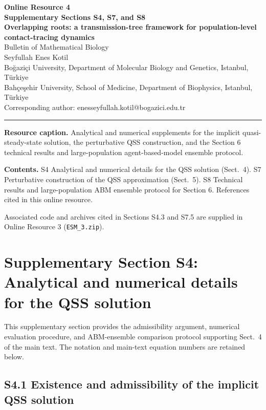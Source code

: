 \documentclass[9pt,a4paper]{article}
\begin{document}
\begin{center}
{\large\bfseries Online Resource 4}\\[0.3em]
{\bfseries Supplementary Sections S4, S7, and S8}\\[1.0em]
{\bfseries Overlapping roots: a transmission-tree framework for population-level contact-tracing dynamics}\\[0.8em]
Bulletin of Mathematical Biology\\[0.6em]
Seyfullah Enes Kotil\\
Boğaziçi University, Department of Molecular Biology and Genetics, Istanbul, Türkiye\\
Bahçeşehir University, School of Medicine, Department of Biophysics, Istanbul, Türkiye\\[0.4em]
Corresponding author: enesseyfullah.kotil@bogazici.edu.tr
\end{center}
\vspace{0.3em}\hrule\vspace{0.8em}

\textbf{Resource caption.} Analytical and numerical supplements for the implicit quasi-steady-state solution, the perturbative QSS construction, and the Section 6 technical results and large-population agent-based-model ensemble protocol.

\textbf{Contents.} S4 Analytical and numerical details for the QSS solution (Sect.~4). S7 Perturbative construction of the QSS approximation (Sect.~5). S8 Technical results and large-population ABM ensemble protocol for Section 6. References cited in this online resource.

Associated code and archives cited in Sections S4.3 and S7.5 are supplied in Online Resource 3 (\texttt{ESM\_3.zip}).

\section*{Supplementary Section S4: Analytical and numerical details for the QSS solution}

This supplementary section provides the admissibility argument, numerical evaluation procedure, and ABM-ensemble comparison protocol supporting Sect.~4 of the main text. The notation and main-text equation numbers are retained below.

\subsection*{S4.1 Existence and admissibility of the implicit QSS solution}
\end{document}
